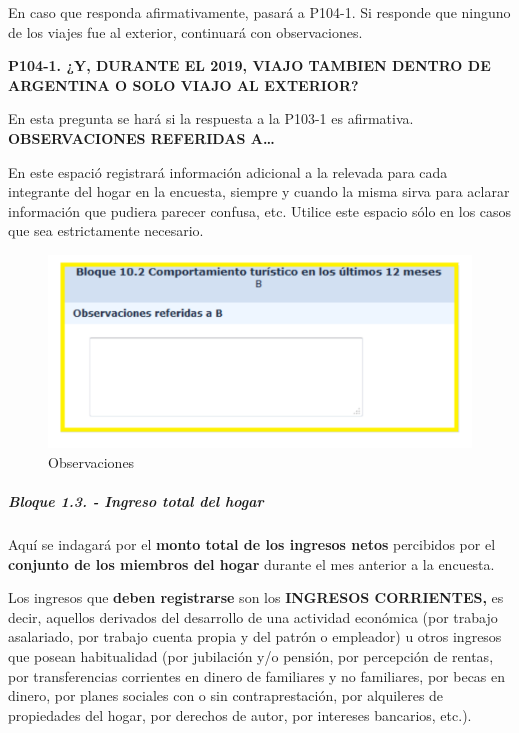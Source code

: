 \documentclass[
  openany]{book}
\begin{document}
En caso que responda afirmativamente, pasará a P104-1. Si responde que ninguno de los viajes fue al exterior, continuará con observaciones.

\textbf{P104-1. ¿Y, DURANTE EL 2019, VIAJO TAMBIEN DENTRO DE ARGENTINA O SOLO VIAJO AL EXTERIOR?}

En esta pregunta se hará si la respuesta a la P103-1 es afirmativa. \textbf{OBSERVACIONES REFERIDAS A\ldots{}}

En este espació registrará información adicional a la relevada para cada integrante del hogar en la encuesta, siempre y cuando la misma sirva para aclarar información que pudiera parecer confusa, etc. Utilice este espacio sólo en los casos que sea estrictamente necesario.

\begin{figure}

{\centering \includegraphics[width=1\linewidth]{imagenes/figura6-60} 

}

\caption{Observaciones}\label{fig:bloque10}
\end{figure}

\hypertarget{bloque-1.3.---ingreso-total-del-hogar}{%
\subparagraph{Bloque 1.3. - Ingreso total del hogar}\label{bloque-1.3.---ingreso-total-del-hogar}}

Aquí se indagará por el \textbf{monto total de los ingresos netos} percibidos por el \textbf{conjunto de los miembros del hogar} durante el mes anterior a la encuesta.

Los ingresos que \textbf{deben registrarse} son los \textbf{INGRESOS CORRIENTES,} es decir, aquellos derivados del desarrollo de una actividad económica (por trabajo asalariado, por trabajo cuenta propia y del patrón o empleador) u otros ingresos que posean habitualidad (por jubilación y/o pensión, por percepción de rentas, por transferencias corrientes en dinero de familiares y no familiares, por becas en dinero, por planes sociales con o sin contraprestación, por alquileres de propiedades del hogar, por derechos de autor, por intereses bancarios, etc.).
\end{document}
